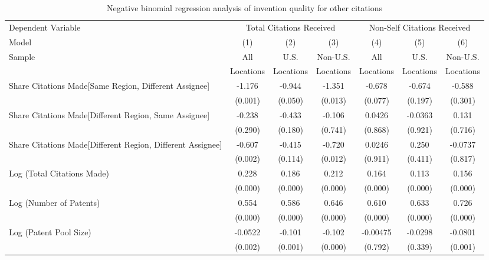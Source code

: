 \begin{sidewaystable}[htbp]\centering
\caption{Negative binomial regression analysis of invention quality for other citations \label{o.model123192021}}
\small
\onehalfspacing
\begin{tabular}{l*{6}{c}}
\hline\hline
 Dependent Variable&\multicolumn{3}{c}{Total Citations Received}&\multicolumn{3}{c}{Non-Self Citations Received}\\
                Model&\multicolumn{1}{c}{(1)}&\multicolumn{1}{c}{(2)}&\multicolumn{1}{c}{(3)}&\multicolumn{1}{c}{(4)}&\multicolumn{1}{c}{(5)}&\multicolumn{1}{c}{(6)}\\
                 \hline
 \multirow{2}{*}{Sample}&\multicolumn{1}{c}{All}&\multicolumn{1}{c}{U.S.}&\multicolumn{1}{c}{Non-U.S.}&\multicolumn{1}{c}{All}&\multicolumn{1}{c}{U.S.}&\multicolumn{1}{c}{Non-U.S.}\\       
  &\multicolumn{1}{c}{Locations}&\multicolumn{1}{c}{Locations}&\multicolumn{1}{c}{Locations}&\multicolumn{1}{c}{Locations}&\multicolumn{1}{c}{Locations}&\multicolumn{1}{c}{Locations}\\        
\hline
Share Citations Made[Same Region, Different Assignee]&   -1.176&   -0.944&   -1.351&   -0.678&   -0.674&   -0.588\\
                &  (0.001)&  (0.050)&  (0.013)&  (0.077)&  (0.197)&  (0.301)\\
Share Citations Made[Different Region, Same Assignee]&   -0.238&   -0.433&   -0.106&   0.0426&  -0.0363&    0.131\\
                &  (0.290)&  (0.180)&  (0.741)&  (0.868)&  (0.921)&  (0.716)\\
Share Citations Made[Different Region, Different Assignee]&   -0.607&   -0.415&   -0.720&   0.0246&    0.250&  -0.0737\\
                &  (0.002)&  (0.114)&  (0.012)&  (0.911)&  (0.411)&  (0.817)\\
Log (Total Citations Made)&    0.228&    0.186&    0.212&    0.164&    0.113&    0.156\\
                &  (0.000)&  (0.000)&  (0.000)&  (0.000)&  (0.000)&  (0.000)\\
Log (Number of Patents)&    0.554&    0.586&    0.646&    0.610&    0.633&    0.726\\
                &  (0.000)&  (0.000)&  (0.000)&  (0.000)&  (0.000)&  (0.000)\\
Log (Patent Pool Size)&  -0.0522&   -0.101&   -0.102& -0.00475&  -0.0298&  -0.0801\\
                &  (0.002)&  (0.001)&  (0.000)&  (0.792)&  (0.339)&  (0.001)\\

\end{tabular}
\end{sidewaystable}
